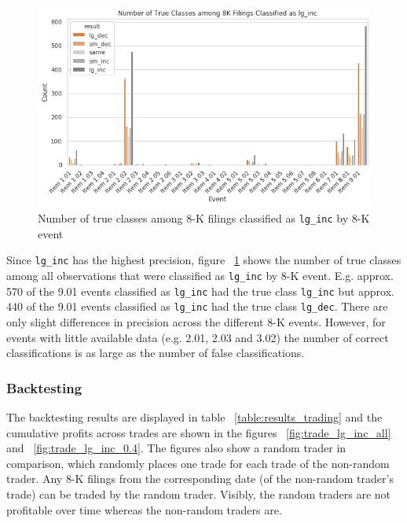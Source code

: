\documentclass{article}
\begin{document}
	\begin{figure}[h!]
		\includegraphics[width=\linewidth]{img/class_by_lg_dec.png}
		\caption{Number of true classes among 8-K filings classified as \lstinline{lg_inc} by 8-K event}
		\label{fig:class_by_lg_dec}
	\end{figure}

 	Since \lstinline{lg_inc} has the highest precision, figure ~\ref{fig:class_by_lg_dec} shows the number of true classes among all observations that were classified as \lstinline{lg_inc} by 8-K event. E.g. approx. 570 of the 9.01 events classified as \lstinline{lg_inc} had the true class \lstinline{lg_inc} but approx. 440 of the 9.01 events classified as \lstinline{lg_inc} had the true class \lstinline{lg_dec}. There are only slight differences in precision across the different 8-K events. However, for events with little available data (e.g. 2.01, 2.03 and 3.02) the number of correct classifications is as large as the number of false classifications.

	\subsubsection{Backtesting}

	The backtesting results are displayed in table ~\ref{table:results_trading} and the cumulative profits across trades are shown in the figures ~\ref{fig:trade_lg_inc_all} and ~\ref{fig:trade_lg_inc_0.4}. The figures also show a random trader in comparison, which randomly places one trade for each trade of the non-random trader. Any 8-K filings from the corresponding date (of the non-random trader's trade) can be traded by the random trader. Visibly, the random traders are not profitable over time whereas the non-random traders are.
	
\end{document}
